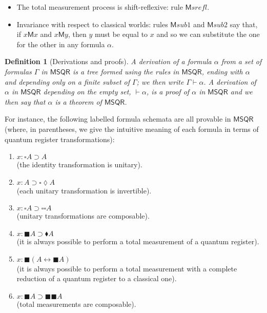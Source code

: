 \documentclass[times, 10pt]{article}
\newcommand{\varimp}{\supset}
\newcommand{\MSQR}{\textsf{MSQR}}
\newcommand{\measB}{\blacksquare}
\newcommand{\measD}{\blacklozenge}
\newcommand{\uniB}{\square}
\newcommand{\uniD}{\lozenge}
\newcommand{\Me}{\textsf{M}}
\newtheorem{definition}{Definition}
\renewcommand{\Me}{\mathsf{M}}
\newcommand{\Mesrefl}{\Me\mathit{srefl}}
\newcommand{\Mesubone}{\Me\mathit{sub1}}
\newcommand{\Mesubtwo}{\Me\mathit{sub2}}
\begin{document}
\begin{description}
\begin{itemize}
\begin{itemize}
\item The total measurement process is shift-reflexive: rule $\Mesrefl$.
\item Invariance with respect to classical worlds: rules $\Mesubone$ and $\Mesubtwo$ say that, if 
$x \Me x$ and $x \Me y$, then $y$ must be equal to $x$ and so we can substitute the one for the other in any formula $\alpha$.
\end{itemize}
\end{itemize}
\end{description}

\begin{definition}[Derivations and proofs]
  A \emph{derivation} of a formula $\alpha$ from a set of formulas
  $\Gamma$ in $\MSQR$ is a tree formed using the rules in $\MSQR$,
  ending with $\alpha$ and depending only on a finite subset of
  $\Gamma$; we then write $\Gamma \vdash \alpha$.  A derivation of
  $\alpha$ in $\MSQR$ depending on the empty set, $\vdash \alpha$, is
  a \emph{proof} of $\alpha$ in $\MSQR$ and we then say that $\alpha$
  is a theorem of $\MSQR$.
\end{definition}

For instance, the following labelled formula schemata are all provable
in $\MSQR$ (where, in parentheses, we give the intuitive meaning of
each formula in terms of quantum register transformations):
\begin{enumerate}
\item $x: \uniB A \varimp A $\\ (the identity transformation is unitary).
\item $x: A \varimp \uniB\uniD A$ \\ (each unitary transformation is invertible).
\item $x: \uniB A \varimp \uniB\uniB A  $\\ (unitary transformations are composable).
\item $x: \measB A \varimp \measD A$ \\
(it is always possible to perform a total measurement of a quantum register).
\item\label{example-one} $x: \measB (A \leftrightarrow \measB A)$ \\ 
(it is always possible to perform a total measurement with a complete reduction of a quantum register to a classical one).
\item\label{example-two}
 $x: \measB A \varimp \measB\measB A$ \\ 
 (total measurements are composable).
\end{enumerate}
\end{document}
